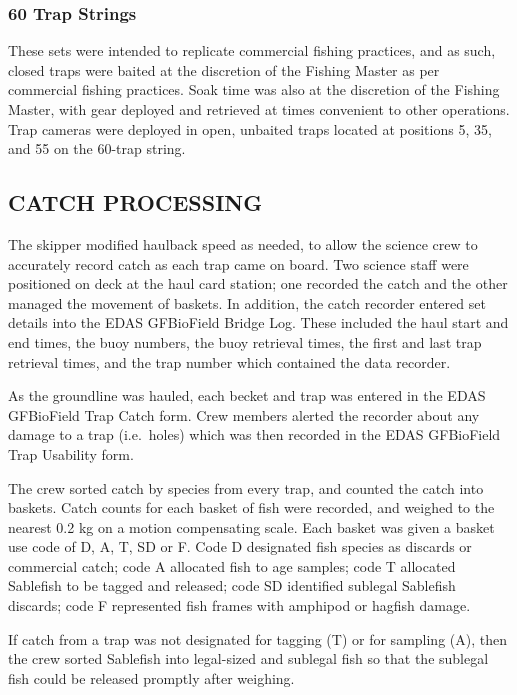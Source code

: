 \documentclass[12pt]{article}\usepackage[]{graphicx}\usepackage[]{color}
\begin{document}
\hypertarget{trap-strings-1}{%
\subsubsection{60 Trap Strings}\label{trap-strings-1}}

These sets were intended to replicate commercial fishing practices, and as such, closed traps were baited at the discretion of the Fishing Master as per commercial fishing practices. Soak time was also at the discretion of the Fishing Master, with gear deployed and retrieved at times convenient to other operations. Trap cameras were deployed in open, unbaited traps located at positions 5, 35, and 55 on the 60-trap string.

\hypertarget{catch-processing}{%
\subsection{CATCH PROCESSING}\label{catch-processing}}

The skipper modified haulback speed as needed, to allow the science crew to accurately record catch as each trap came on board. Two science staff were positioned on deck at the haul card station; one recorded the catch and the other managed the movement of baskets. In addition, the catch recorder entered set details into the EDAS GFBioField Bridge Log. These included the haul start and end times, the buoy numbers, the buoy retrieval times, the first and last trap retrieval times, and the trap number which contained the data recorder.

As the groundline was hauled, each becket and trap was entered in the EDAS GFBioField Trap Catch form. Crew members alerted the recorder about any damage to a trap (i.e.~holes) which was then recorded in the EDAS GFBioField Trap Usability form.

The crew sorted catch by species from every trap, and counted the catch into baskets. Catch counts for each basket of fish were recorded, and weighed to the nearest 0.2 kg on a motion compensating scale. Each basket was given a basket use code of D, A, T, SD or F. Code D designated fish species as discards or commercial catch; code A allocated fish to age samples; code T allocated Sablefish to be tagged and released; code SD identified sublegal Sablefish discards; code F represented fish frames with amphipod or hagfish damage.

If catch from a trap was not designated for tagging (T) or for sampling (A), then the crew sorted Sablefish into legal-sized and sublegal fish so that the sublegal fish could be released promptly after weighing.
\end{document}
